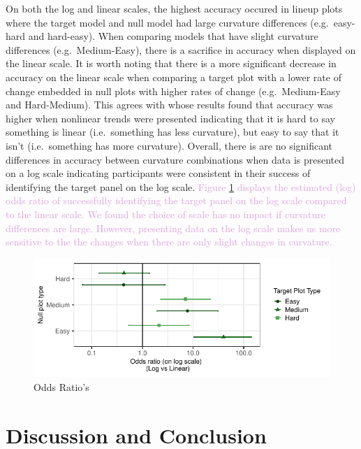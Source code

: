 \documentclass[]{interact}
\theoremstyle{plain}%
\theoremstyle{definition}
\theoremstyle{remark}
\begin{document}
On both the log and linear scales, the highest accuracy occured in
lineup plots where the target model and null model had large curvature
differences (e.g.~easy-hard and hard-easy). When comparing models that
have slight curvature differences (e.g.~Medium-Easy), there is a
sacrifice in accuracy when displayed on the linear scale. It is worth
noting that there is a more significant decrease in accuracy on the
linear scale when comparing a target plot with a lower rate of change
embedded in null plots with higher rates of change (e.g.~Medium-Easy and
Hard-Medium). This agrees with \cite{best_perception_2007} whose results
found that accuracy was higher when nonlinear trends were presented
indicating that it is hard to say something is linear (i.e.~something
has less curvature), but easy to say that it isn't (i.e.~something has
more curvature). Overall, there is are no significant differences in
accuracy between curvature combinations when data is presented on a log
scale indicating participants were consistent in their success of
identifying the target panel on the log scale.
\textcolor{Plum}{Figure \ref{fig:odds-ratio-plot} displays the estimated (log) odds ratio of successfully identifying the target panel on the log scale compared to the linear scale. We found the choice of scale has no impact if curvature differences are large. However, presenting data on the log scale makes us more sensitive to the the changes when there are only slight changes in curvature.}

\begin{figure}

{\centering \includegraphics{jsm-2021-student-paper-submission_files/figure-latex/odds-ratio-plot-1} 

}

\caption{Odds Ratio's}\label{fig:odds-ratio-plot}
\end{figure}

\hypertarget{discussion-and-conclusion}{%
\section{Discussion and Conclusion}\label{discussion-and-conclusion}}
\end{document}
